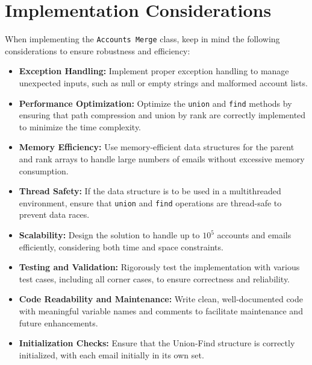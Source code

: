\section*{Implementation Considerations}

When implementing the \texttt{Accounts Merge} class, keep in mind the following considerations to ensure robustness and efficiency:

\begin{itemize}
    \item \textbf{Exception Handling:}  
    Implement proper exception handling to manage unexpected inputs, such as null or empty strings and malformed account lists.
    
    \item \textbf{Performance Optimization:}  
    Optimize the \texttt{union} and \texttt{find} methods by ensuring that path compression and union by rank are correctly implemented to minimize the time complexity.
    
    \item \textbf{Memory Efficiency:}  
    Use memory-efficient data structures for the parent and rank arrays to handle large numbers of emails without excessive memory consumption.
    
    \item \textbf{Thread Safety:}  
    If the data structure is to be used in a multithreaded environment, ensure that \texttt{union} and \texttt{find} operations are thread-safe to prevent data races.
    
    \item \textbf{Scalability:}  
    Design the solution to handle up to \(10^5\) accounts and emails efficiently, considering both time and space constraints.
    
    \item \textbf{Testing and Validation:}  
    Rigorously test the implementation with various test cases, including all corner cases, to ensure correctness and reliability.
    
    \item \textbf{Code Readability and Maintenance:} 
    Write clean, well-documented code with meaningful variable names and comments to facilitate maintenance and future enhancements.
    
    \item \textbf{Initialization Checks:}  
    Ensure that the Union-Find structure is correctly initialized, with each email initially in its own set.
\end{itemize}

